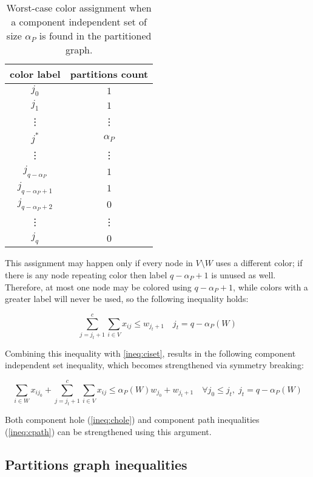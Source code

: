 \begin{table}
\centering	
\begin{tabular}{cc}
\hline
\textbf{color label} & \textbf{partitions count} \\
\hline
$j_0$ & $1$\\
$j_1$ & $1$\\
\vdots & \vdots \\
$j^*$ & $\alpha_P$ \\
\vdots & \vdots \\
$j_{q - \alpha_P}$ & $1$\\
$j_{q - \alpha_P + 1}$ & $1$\\
$j_{q - \alpha_P + 2}$ & $0$\\
\vdots & \vdots \\
$j_{q}$ & $0$\\
\hline
\end{tabular}
\caption{Worst-case color assignment when a component independent set of size $\alpha_P$ is found in the partitioned graph.}
	\label{table:cisetcoloring}
\end{table}

This assignment may happen only if every node in $V \setminus W$ uses a different color; if there is any node repeating color then label $q - \alpha_P + 1$ is unused as well. Therefore, at most one node may be colored using $q - \alpha_P + 1$, while colors with a greater label will never be used, so the following inequality holds:

\begin{equation}
\label{ineq:cisetbshigh}
\sum ^c _{j = j_t + 1} \sum _{i \in V} x_{ij} \leq w_{j_t + 1} \quad j_t = q - \alpha_P(W)
\end{equation}

Combining this inequality with \ref{ineq:ciset}, results in the following component independent set inequality, which becomes strengthened via symmetry breaking:

\begin{equation}
\label{ineq:cisetbs}
\sum_{i \in W} x_{ij_0} + \sum ^c _{j = j_t + 1} \sum _{i \in V} x_{ij} \leq \alpha_P(W) w_{j_0} + w_{j_t + 1} \quad \forall j_0 \leq j_t, \; j_t = q - \alpha_P(W)
\end{equation}

Both component hole (\ref{ineq:chole}) and component path inequalities (\ref{ineq:cpath}) can be strengthened using this argument.

\subsection{Partitions graph inequalities}

